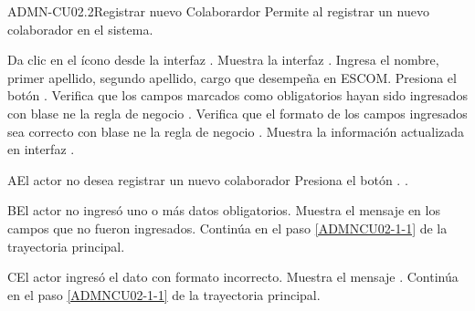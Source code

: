 \begin{UseCase}{ADMN-CU02.2}{Registrar nuevo Colaborardor}{
	Permite al registrar un nuevo colaborador en el sistema.
}
	  

\end{UseCase}

\begin{UCtrayectoria}
	\UCpaso [\UCactor] Da clic en el ícono \IUAgregar{} desde la interfaz .
	\UCpaso [\UCsist] Muestra la interfaz .
	\UCpaso [\UCactor] \label{ADMNCU02-1-1} Ingresa el nombre, primer apellido, segundo apellido, cargo que desempeña en ESCOM.
	\UCpaso [\UCactor] Presiona el botón .
	\UCpaso Verifica que los campos marcados como obligatorios hayan sido ingresados con blase ne la regla de negocio .
	\UCpaso Verifica que el formato de los campos ingresados sea correcto con blase ne la regla de negocio .
    \UCpaso [\UCsist] Muestra la información actualizada en interfaz .
	
\end{UCtrayectoria}

\begin{UCtrayectoriaA}{A}{El actor no desea registrar un nuevo colaborador}
	\UCpaso [\UCsist] Presiona el botón .
	.
\end{UCtrayectoriaA} 

\begin{UCtrayectoriaA}{B}{El actor no ingresó uno o más datos obligatorios.}
	\UCpaso [\UCsist] Muestra el mensaje  en los campos que no fueron ingresados.
	\UCpaso [\UCsist] Continúa en el paso \ref{ADMNCU02-1-1} de la trayectoria principal.
\end{UCtrayectoriaA} 

\begin{UCtrayectoriaA}{C}{El actor ingresó el dato con formato incorrecto.}
	\UCpaso [\UCsist] Muestra el mensaje .
	\UCpaso [\UCsist] Continúa en el paso \ref{ADMNCU02-1-1} de la trayectoria principal.
\end{UCtrayectoriaA}


